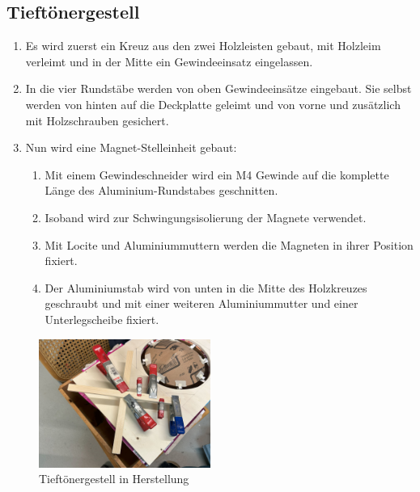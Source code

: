 \documentclass[a4paper,11pt]{report}
\begin{document}
\subsection{Tieftönergestell}
\begin{enumerate}
    \item Es wird zuerst ein Kreuz aus den zwei Holzleisten gebaut, mit Holzleim verleimt und in der Mitte ein Gewindeeinsatz eingelassen.
    \item In die vier Rundstäbe werden von oben Gewindeeinsätze eingebaut. Sie selbst werden von hinten auf die Deckplatte geleimt und von vorne und zusätzlich mit Holzschrauben gesichert.
    \item Nun wird eine Magnet-Stelleinheit gebaut:
    \begin{enumerate}
        \item Mit einem Gewindeschneider wird ein M4 Gewinde auf die komplette Länge des Aluminium-Rundstabes geschnitten.
        \item Isoband wird zur Schwingungsisolierung der Magnete verwendet.
        \item Mit Locite und Aluminiummuttern werden die Magneten in ihrer Position fixiert.
        \item Der Aluminiumstab wird von unten in die Mitte des Holzkreuzes geschraubt und mit einer weiteren Aluminiummutter und einer Unterlegscheibe fixiert.
    \end{enumerate}
\end{enumerate}
\begin{figure}[h]
    \centering
    \includegraphics[width=0.5\textwidth]{resources/images/Fotos/Physik-69.jpg}
    \caption{{Tieftönergestell in Herstellung}}
    \label{fig:production}
\end{figure}

\newpage
\end{document}
